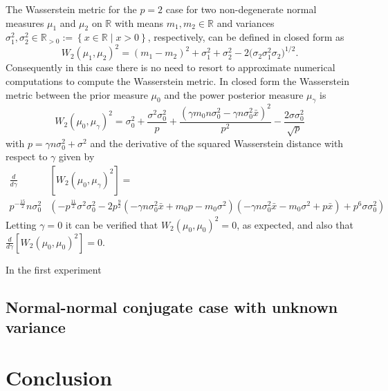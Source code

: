 \documentclass{article}
\begin{document}
The Wasserstein metric for the $p = 2$ case for two non-degenerate normal
measures $\mu_1$ and $\mu_2$ on $\mathbb{R}$ with means $m_1, m_2 \in
\mathbb{R}$ and variances $\sigma_1^2, \sigma_2^2 \in \mathbb{R}_{>0} :=
\left\lbrace x \in \mathbb{R} \; | \; x > 0 \right\rbrace$, respectively, can
be defined in closed form as
\begin{equation}
W_{2} (\mu_1, \mu_2)^2 = \left( m_1 - m_2 \right)^2 + \sigma_1^2 + \sigma_2^2 - 2 \bigl( \sigma_2 \sigma_1^2 \sigma_2 \bigr)^{1/2}.
\end{equation}
Consequently in this case there is no need to resort to approximate numerical
computations to compute the Wasserstein metric. In closed form the Wasserstein
metric between the prior measure $\mu_0$ and the power posterior measure
$\mu_\gamma$ is
\begin{equation}
W_2(\mu_0, \mu_\gamma)^2 = \sigma_{0}^{2} + \frac{\sigma^{2} \sigma_{0}^{2}}{p} + \frac{\left(\gamma m_{0} n \sigma_{0}^{2} - \gamma n \sigma_{0}^{2} \bar{x}\right)^{2}}{p^{2}} - \frac{2 \sigma \sigma_{0}^{2}}{\sqrt{p}}
\end{equation}
with $p = \gamma n \sigma_{0}^{2} + \sigma^{2}$ and the derivative of the
squared Wasserstein distance with respect to $\gamma$ given by
\begin{equation}
\begin{split}
\frac{d}{d\gamma} &[W_2(\mu_0, \mu_\gamma)^2] = \\
p^{-\frac{15}{2}}n \sigma_{0}^{2} &\left(- p^{\frac{11}{2}} \sigma^{2} \sigma_{0}^{2} - 2 p^{\frac{9}{2}} \left(- \gamma n \sigma_{0}^{2} \bar{x} + m_{0} p - m_{0} \sigma^{2}\right) \left(- \gamma n \sigma_{0}^{2} \bar{x} - m_{0} \sigma^{2} + p \bar{x}\right) + p^{6} \sigma \sigma_{0}^{2}\right)
\end{split}
\end{equation}
Letting $\gamma = 0$ it can be verified that $W_2(\mu_0, \mu_0)^2 = 0$, as
expected, and also that $\frac{d}{d\gamma}[W_2(\mu_0, \mu_0)^2] = 0$. 

In the first experiment 

\subsection{Normal-normal conjugate case with unknown variance}

\section{Conclusion}
\end{document}
